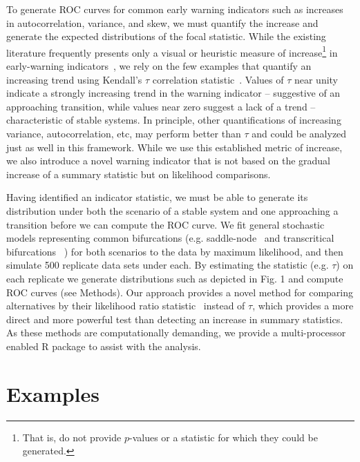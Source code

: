 \documentclass{pnastwo}
\begin{document}
\begin{article}
To generate ROC curves for common early warning indicators such as 
increases in autocorrelation, variance, and skew, 
we must quantify the increase and generate the expected distributions of the focal statistic.  
While the existing literature frequently presents only a 
visual or heuristic measure of increase\footnote{That is, do not provide $p$-values or a statistic for which they could be generated.} in early-warning indicators~\cite{Scheffer2009, Drake2010, Carpenter2011, Carpenter2006}, 
we rely on the few examples that quantify an increasing trend using Kendall's $\tau$ correlation statistic~\cite{Dakos2008, Dakos2011, Dakos2009}.
Values of $\tau$ near unity indicate a strongly increasing trend in the warning indicator --
suggestive of an approaching transition, while values near zero suggest a lack of a trend -- characteristic of stable systems.
In principle, other quantifications of increasing variance, autocorrelation, etc,
may perform better than $\tau$ and could be analyzed just as well in this framework. 
While we use this established metric of increase, we also introduce a novel warning indicator
that is not based on the gradual increase of a summary statistic but on likelihood comparisons.  

Having identified an indicator statistic,
we must be able to generate its distribution under both the scenario of a stable system and 
one approaching a transition before we can compute the ROC curve.
We fit general stochastic models representing common bifurcations
(e.g. saddle-node~\cite{Scheffer2009, Guttal2008a, VanNes2007, Biggs2009} and transcritical bifurcations~\cite{Drake2010} )
for both scenarios to the data by maximum likelihood, and then simulate 500 replicate data sets under each⁠. 
By estimating the statistic (e.g. $\tau$) on each replicate we generate distributions such as depicted in Fig. 1 and compute ROC curves (see Methods).
Our approach provides a novel method for comparing alternatives by their likelihood ratio statistic~\cite{Cox1961}⁠ instead of $\tau$,
which provides a more direct and more powerful test than detecting an increase in summary statistics.
As these methods are computationally demanding, we provide a multi-processor enabled R package to assist with the analysis. 

\section{Examples}


\end{article}
\end{document}
